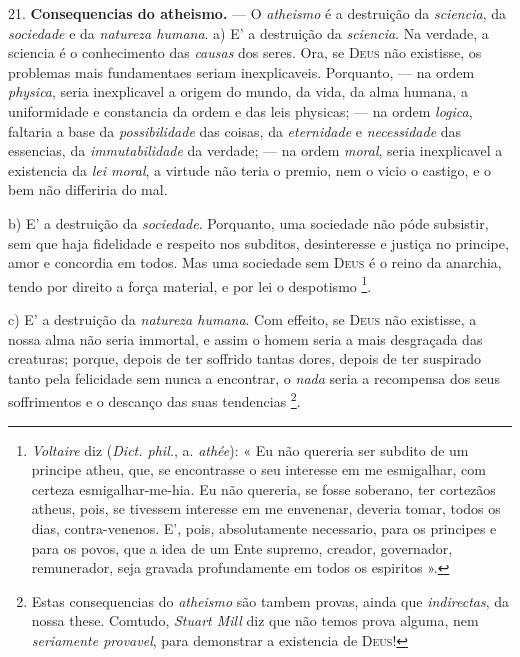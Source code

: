 21. \textbf{Consequencias do atheismo.} --- O \emph{atheismo} é a destruição da \emph{sciencia}, da \emph{sociedade} e da \emph{natureza humana}.
 a) E' a destruição da \emph{sciencia}. Na verdade, a sciencia é o conhecimento das \emph{causas} dos seres. Ora, se \textsc{Deus} não existisse, os problemas mais fundamentaes seriam inexplicaveis. Porquanto, --- na ordem \emph{physica}, seria inexplicavel a origem do mundo, da vida, da alma humana, a uniformidade e constancia da ordem e das leis physicas; --- na ordem \emph{logica}, faltaria a base da \emph{possibilidade} das coisas, da \emph{eternidade} e \emph{necessidade} das essencias, da \emph{immutabilidade} da verdade; --- na ordem \emph{moral}, seria inexplicavel a existencia da \emph{lei moral}, a virtude não teria o premio, nem o vicio o castigo, e o bem não differiria do mal.

b) E' a destruição da \emph{sociedade}. Porquanto, uma sociedade não póde subsistir, sem que haja fidelidade e respeito nos subditos, desinteresse e justiça no principe, amor e concordia em todos. Mas uma sociedade sem \textsc{Deus} é o reino da anarchia, tendo por direito a força material, e por lei o despotismo \footnote{\emph{Voltaire} diz (\emph{Dict. phil.}, a. \emph{athée}): « Eu não quereria ser subdito de um principe atheu, que, se encontrasse o seu interesse em me esmigalhar, com certeza esmigalhar-me-hia. Eu não quereria, se fosse soberano, ter cortezãos atheus, pois, se tivessem interesse em me envenenar, deveria tomar, todos os dias, contra-venenos. E', pois, absolutamente necessario, para os principes e para os povos, que a idea de um Ente supremo, creador, governador, remunerador, seja gravada profundamente em todos os espiritos ».}.

c) E' a destruição da \emph{natureza humana}. Com effeito, se \textsc{Deus} não existisse, a nossa alma não seria immortal, e assim o homem seria a mais desgraçada das creaturas; porque, depois de ter soffrido tantas dores, depois de ter suspirado tanto pela felicidade sem nunca a encontrar, o \emph{nada} seria a recompensa dos seus soffrimentos e o descanço das suas tendencias \footnote{Estas consequencias do \emph{atheismo} são tambem provas, ainda que \emph{indirectas}, da nossa these. Comtudo, \emph{Stuart Mill} diz que não temos prova alguma, nem \emph{seriamente provavel}, para demonstrar a existencia de \textsc{Deus}!}.
